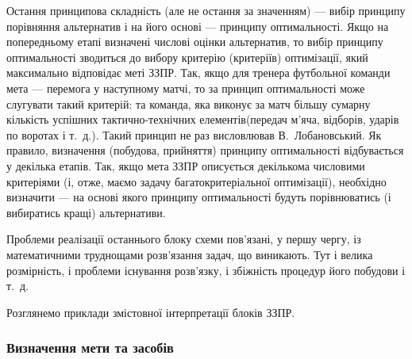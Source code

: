 \documentclass[a4paper, 12pt]{article}
\begin{document}
Остання принципова складність (але не остання за значенням) --- вибір принципу порівняння альтернатив і на його основі --- принципу оптимальності. Якщо на попередньому етапі визначені числові оцінки альтернатив, то вибір принципу оптимальності зводиться до вибору критерію (критеріїв) оптимізації, який максимально відповідає меті ЗЗПР. Так, якщо для тренера футбольної команди мета --- перемога у наступному матчі, то за принцип оптимальності може слугувати такий критерій:  та команда, яка виконує за матч більшу сумарну кількість успішних тактично-технічних елементів\guillemotright (передач м'яча, відборів, ударів по воротах і т.~д.). Такий принцип не раз висловлював В.~Лобановський. Як правило, визначення (побудова, прийняття) принципу оптимальності відбувається у декілька етапів. Так, якщо мета ЗЗПР описується декількома числовими критеріями (і, отже, маємо задачу багатокритеріальної оптимізації), необхідно визначити --- на основі якого \guillemotright принципу оптимальності будуть порівнюватись (і вибиратись кращі) альтернативи. \medskip

Проблеми реалізації останнього блоку схеми пов'язані, у першу чергу, із математичними труднощами розв'язання задач, що виникають. Тут і велика розмірність, і проблеми існування розв'язку, і збіжність процедур його побудови і т.~д. \medskip

Розглянемо приклади змістовної інтерпретації блоків ЗЗПР.

\subsubsection{Визначення мети та засобів}
\end{document}
